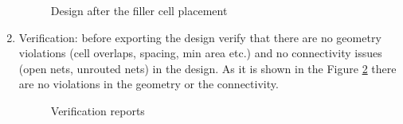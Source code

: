 \documentclass[a4paper,11pt]{article}%
\begin{document}
\begin{enumerate}[1.)]
	\begin{figure}[H]
		\centering
		\caption{Design after the filler cell placement}
		\label{fig:innovus_q18_2}
	\end{figure}

	\item Verification: before exporting the design verify that there are no geometry violations (cell overlaps, spacing, min area etc.) and no connectivity issues (open nets, unrouted nets) in the design. As it is shown in the Figure \ref{fig:verification} there are no violations in the geometry or the connectivity.
	
	\begin{figure}[h]
		\centering
		\caption{Verification reports}
		\label{fig:verification}
	\end{figure}
	

\end{enumerate}
\end{document}
